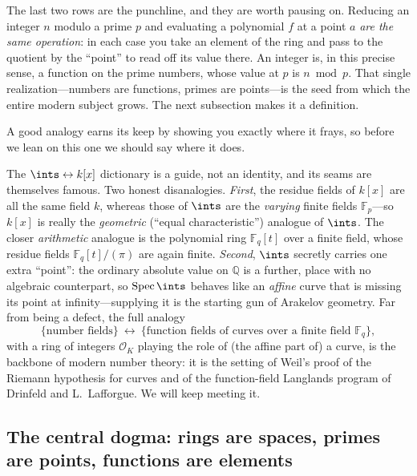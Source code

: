 \documentclass[11pt]{article}
\DeclareMathOperator{\Spec}{Spec}
\begin{document}
\noindent
The last two rows are the punchline, and they are worth pausing on. Reducing an integer $n$
modulo a prime $p$ and evaluating a polynomial $f$ at a point $a$ \emph{are the same
operation}: in each case you take an element of the ring and pass to the quotient by the
``point'' to read off its value there. An integer is, in this precise sense, a function on
the prime numbers, whose value at $p$ is $n \bmod p$. That single realization---numbers are
functions, primes are points---is the seed from which the entire modern subject grows. The
next subsection makes it a definition.

A good analogy earns its keep by showing you exactly where it frays, so before we lean on
this one we should say where it does.

\begin{reemark}
The $\ints\leftrightarrow k[x]$ dictionary is a guide, not an identity, and its seams are
themselves famous. Two honest disanalogies. \emph{First}, the residue fields of $k[x]$ are
all the same field $k$, whereas those of $\ints$ are the \emph{varying} finite fields
$\mathbb{F}_p$---so $k[x]$ is really the \emph{geometric} (``equal characteristic'') analogue
of $\ints$. The closer \emph{arithmetic} analogue is the polynomial ring $\mathbb{F}_q[t]$
over a finite field, whose residue fields $\mathbb{F}_q[t]/(\pi)$ are again finite. \emph{Second},
$\ints$ secretly carries one extra ``point'': the ordinary absolute value on $\mathbb{Q}$ is
a further,  place with no algebraic counterpart, so $\Spec\ints$ behaves
like an \emph{affine} curve that is missing its point at infinity---supplying it is the
starting gun of Arakelov geometry. Far from being a defect, the full analogy
\[
\{\text{number fields}\}\ \longleftrightarrow\ \{\text{function fields of curves over a finite field } \mathbb{F}_q\},
\]
with a ring of integers $\mathcal{O}_K$ playing the role of (the affine part of) a curve, is
the backbone of modern number theory: it is the setting of Weil's proof of the Riemann
hypothesis for curves and of the function-field Langlands program of Drinfeld and L.\
Lafforgue. We will keep meeting it.
\end{reemark}

\subsection{The central dogma: rings are spaces, primes are points, functions are elements}
\end{document}
